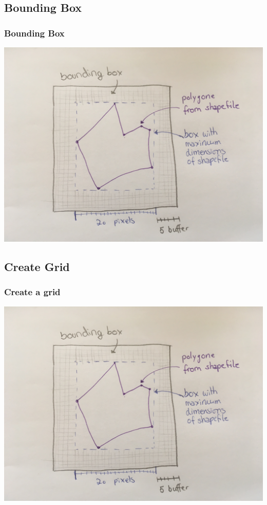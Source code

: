\documentclass[12pt]{beamer}
\begin{document}
\subsection{Bounding Box}
\begin{frame}\frametitle{Bounding Box}
\hspace{0.5cm}
\includegraphics[scale=0.06]{IMG_5505.JPG}
\end{frame}


\subsection{Create Grid}
\begin{frame}\frametitle{Create a grid}
\hspace{0.5cm}
\includegraphics[scale=0.06]{IMG_5505.JPG}
\end{frame}
\end{document}
